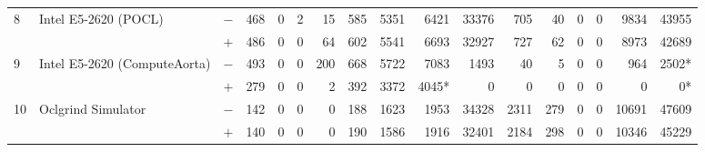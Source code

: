 \begin{tabular}{lll | rrrrrrr | rrrrrrr }
\hline
\multirow{ 2}{*}{8} & \multirow{ 2}{*}{Intel E5-2620 (POCL)} & $-$ & 468 & 0 & 2 & 15 & 585 & 5351 & 6421       & 33376 & 705 & 40 & 0 & 0 & 9834 & 43955 \\& & $+$ & 486 & 0 & 0 & 64 & 602 & 5541 & 6693 & 32927 & 727 & 62 & 0 & 0 & 8973 & 42689 \\
\hline
\multirow{ 2}{*}{9} & \multirow{ 2}{*}{Intel E5-2620 (ComputeAorta)} & $-$ & 493 & 0 & 0 & 200 & 668 & 5722 & 7083       & 1493 & 40 & 5 & 0 & 0 & 964 & 2502* \\& & $+$ & 279 & 0 & 0 & 2 & 392 & 3372 & 4045* & 0 & 0 & 0 & 0 & 0 & 0 & 0* \\
\hline
\multirow{ 2}{*}{10} & \multirow{ 2}{*}{Oclgrind Simulator} & $-$ & 142 & 0 & 0 & 0 & 188 & 1623 & 1953       & 34328 & 2311 & 279 & 0 & 0 & 10691 & 47609 \\& & $+$ & 140 & 0 & 0 & 0 & 190 & 1586 & 1916 & 32401 & 2184 & 298 & 0 & 0 & 10346 & 45229 \\
  \bottomrule
\end{tabular}

